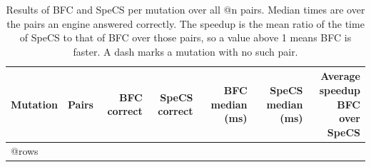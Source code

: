 \begin{table}[t]
  \centering
  \small
  \caption{Results of \acs{BFC} and SpeCS per mutation over all @n pairs.
Median times are over the pairs an engine answered correctly.
The speedup is the mean ratio of the time of SpeCS to that of \acs{BFC} over those pairs, so a value above 1 means \acs{BFC} is faster.
A dash marks a mutation with no such pair.}
  \label{fig:operator_bfc_specs}
  \begin{tabular}{lrrrrrr}
    \toprule
    Mutation & Pairs & \acs{BFC} correct & SpeCS correct & \acs{BFC} median (ms) & SpeCS median (ms) & \shortstack[r]{Average speedup\\\acs{BFC} over SpeCS} \\
    \midrule
@rows
    \bottomrule
  \end{tabular}
\end{table}
